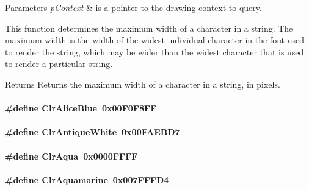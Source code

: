 \begin{DoxyParams}{Parameters}
{\em p\+Context} & is a pointer to the drawing context to query.\\
\hline
\end{DoxyParams}
This function determines the maximum width of a character in a string. The maximum width is the width of the widest individual character in the font used to render the string, which may be wider than the widest character that is used to render a particular string.

\begin{DoxyReturn}{Returns}
Returns the maximum width of a character in a string, in pixels. 
\end{DoxyReturn}
\paragraph[{Clr\+Alice\+Blue}]{\setlength{\rightskip}{0pt plus 5cm}\#define Clr\+Alice\+Blue~0x00\+F0\+F8\+F\+F}\label{group__primitives__api_ga2b3c9de1a7707fe905767d241db6ac77}
\paragraph[{Clr\+Antique\+White}]{\setlength{\rightskip}{0pt plus 5cm}\#define Clr\+Antique\+White~0x00\+F\+A\+E\+B\+D7}\label{group__primitives__api_ga581775bdf6f916b683f8463b576a4b41}
\paragraph[{Clr\+Aqua}]{\setlength{\rightskip}{0pt plus 5cm}\#define Clr\+Aqua~0x0000\+F\+F\+F\+F}\label{group__primitives__api_ga87cfae4a204e84e4aa7cd4d93a044892}
\paragraph[{Clr\+Aquamarine}]{\setlength{\rightskip}{0pt plus 5cm}\#define Clr\+Aquamarine~0x007\+F\+F\+F\+D4}\label{group__primitives__api_ga11744daacf236bbcd2e964587746f808}
